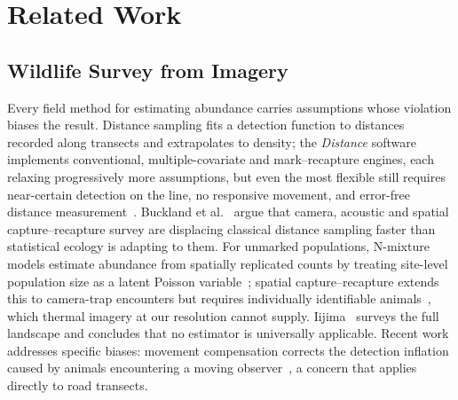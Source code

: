 \section{Related Work}
\label{sec:related}

\subsection{Wildlife Survey from Imagery}

\label{sec:rw:survey}

Every field method for estimating abundance carries assumptions whose violation biases the
result. Distance sampling fits a detection function to distances recorded along transects and
extrapolates to density; the \emph{Distance} software implements conventional,
multiple-covariate and mark--recapture engines, each relaxing progressively more assumptions,
but even the most flexible still requires near-certain detection on the line, no responsive
movement, and error-free distance measurement~\cite{thomas2010distance}. Buckland et
al.~\cite{buckland2023wildlife} argue that camera, acoustic and spatial capture--recapture
survey are displacing classical distance sampling faster than statistical ecology is adapting
to them. For unmarked populations, N-mixture models estimate abundance from spatially
replicated counts by treating site-level population size as a latent Poisson
variable~\cite{royle2004nmixture}; spatial capture--recapture extends this to camera-trap
encounters but requires individually identifiable animals~\cite{royle2009bayesian}, which
thermal imagery at our resolution cannot supply. Iijima~\cite{iijima2020review} surveys the
full landscape and concludes that no estimator is universally applicable. Recent work
addresses specific biases: movement compensation corrects the detection inflation caused by
animals encountering a moving observer~\cite{morgan2024wildlife}, a concern that applies
directly to road transects.

